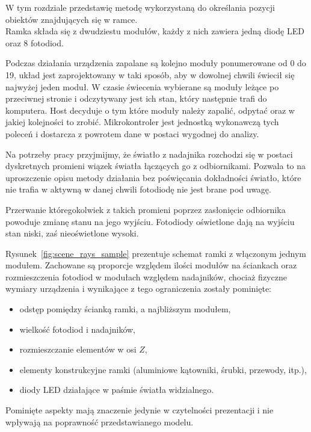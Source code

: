 \label{ch:method}

W tym rozdziale przedstawię metodę wykorzystaną do określania pozycji obiektów znajdujących się w ramce.\\

Ramka składa się z dwudziestu modułów, każdy z nich zawiera jedną diodę LED oraz 8 fotodiod.

Podczas działania urządzenia zapalane są kolejno moduły ponumerowane od 0 do 19, układ jest zaprojektowany w taki sposób, aby w dowolnej chwili świecił się najwyżej jeden moduł. W czasie świecenia wybierane są moduły leżące po przeciwnej stronie i odczytywany jest ich stan, który następnie trafi do komputera. Host decyduje o tym które moduły należy zapalić, odpytać oraz w jakiej kolejności to zrobić. Mikrokontroler jest jednostką wykonawczą tych poleceń i dostarcza z powrotem dane w postaci wygodnej do analizy.

Na potrzeby pracy przyjmijmy, że światło z nadajnika rozchodzi się w postaci dyskretnych promieni \pauza wiązek światła łączących go z odbiornikami. Pozwala to na uproszczenie opisu metody działania bez poświęcania dokładności \pauza światło, które nie trafia w aktywną w danej chwili fotodiodę nie jest brane pod uwagę.

Przerwanie któregokolwiek z takich promieni poprzez zasłonięcie odbiornika powoduje zmianę stanu na jego wyjściu. Fotodiody oświetlone dają na wyjściu stan niski, zaś nieoświetlone \ppauza wysoki.

Rysunek~\ref{fig:scene_rays_sample} prezentuje schemat ramki z włączonym jednym modułem. Zachowane są proporcje względem ilości modułów na ściankach oraz rozmieszczenia fotodiod w modułach względem nadajników, chociaż fizyczne wymiary urządzenia i wynikające z tego ograniczenia zostały pominięte:
\begin{itemize}
 \item odstęp pomiędzy ścianką ramki, a najbliższym modułem,
 \item wielkość fotodiod i nadajników,
 \item rozmieszczanie elementów w osi $Z$,
 \item elementy konstrukcyjne ramki (aluminiowe kątowniki, śrubki, przewody, itp.),
 \item diody LED działające w paśmie światła widzialnego.
\end{itemize}

Pominięte aspekty mają znaczenie jedynie w czytelności prezentacji i nie wpływają na poprawność przedstawianego modelu.


